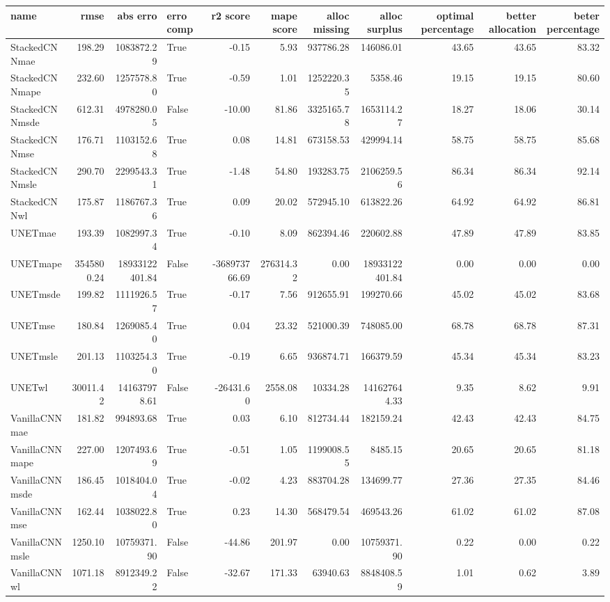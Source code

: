 \begin{tabular}{lrrlrrrrrrr}
\toprule
name & rmse & abs erro & erro comp & r2 score & mape score & alloc missing & alloc surplus & optimal percentage & better allocation & beter percentage \\
\midrule
StackedCNNmae & 198.29 & 1083872.29 & True & -0.15 & 5.93 & 937786.28 & 146086.01 & 43.65 & 43.65 & 83.32 \\
StackedCNNmape & 232.60 & 1257578.80 & True & -0.59 & 1.01 & 1252220.35 & 5358.46 & 19.15 & 19.15 & 80.60 \\
StackedCNNmsde & 612.31 & 4978280.05 & False & -10.00 & 81.86 & 3325165.78 & 1653114.27 & 18.27 & 18.06 & 30.14 \\
StackedCNNmse & 176.71 & 1103152.68 & True & 0.08 & 14.81 & 673158.53 & 429994.14 & 58.75 & 58.75 & 85.68 \\
StackedCNNmsle & 290.70 & 2299543.31 & True & -1.48 & 54.80 & 193283.75 & 2106259.56 & 86.34 & 86.34 & 92.14 \\
StackedCNNwl & 175.87 & 1186767.36 & True & 0.09 & 20.02 & 572945.10 & 613822.26 & 64.92 & 64.92 & 86.81 \\
UNETmae & 193.39 & 1082997.34 & True & -0.10 & 8.09 & 862394.46 & 220602.88 & 47.89 & 47.89 & 83.85 \\
UNETmape & 3545800.24 & 18933122401.84 & False & -368973766.69 & 276314.32 & 0.00 & 18933122401.84 & 0.00 & 0.00 & 0.00 \\
UNETmsde & 199.82 & 1111926.57 & True & -0.17 & 7.56 & 912655.91 & 199270.66 & 45.02 & 45.02 & 83.68 \\
UNETmse & 180.84 & 1269085.40 & True & 0.04 & 23.32 & 521000.39 & 748085.00 & 68.78 & 68.78 & 87.31 \\
UNETmsle & 201.13 & 1103254.30 & True & -0.19 & 6.65 & 936874.71 & 166379.59 & 45.34 & 45.34 & 83.23 \\
UNETwl & 30011.42 & 141637978.61 & False & -26431.60 & 2558.08 & 10334.28 & 141627644.33 & 9.35 & 8.62 & 9.91 \\
VanillaCNNmae & 181.82 & 994893.68 & True & 0.03 & 6.10 & 812734.44 & 182159.24 & 42.43 & 42.43 & 84.75 \\
VanillaCNNmape & 227.00 & 1207493.69 & True & -0.51 & 1.05 & 1199008.55 & 8485.15 & 20.65 & 20.65 & 81.18 \\
VanillaCNNmsde & 186.45 & 1018404.04 & True & -0.02 & 4.23 & 883704.28 & 134699.77 & 27.36 & 27.35 & 84.46 \\
VanillaCNNmse & 162.44 & 1038022.80 & True & 0.23 & 14.30 & 568479.54 & 469543.26 & 61.02 & 61.02 & 87.08 \\
VanillaCNNmsle & 1250.10 & 10759371.90 & False & -44.86 & 201.97 & 0.00 & 10759371.90 & 0.22 & 0.00 & 0.22 \\
VanillaCNNwl & 1071.18 & 8912349.22 & False & -32.67 & 171.33 & 63940.63 & 8848408.59 & 1.01 & 0.62 & 3.89 \\
\bottomrule
\end{tabular}

